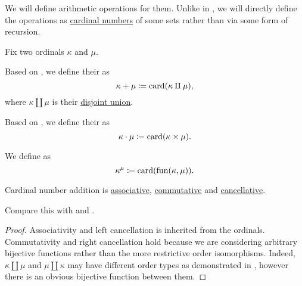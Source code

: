 \begin{definition}\label{def:cardinal_arithmetic}
  We will define arithmetic operations for them. Unlike in , we will directly define the operations as \hyperref[thm:cardinality_existence]{cardinal numbers} of some sets rather than via some form of recursion.

  Fix two ordinals \( \kappa \) and \( \mu \).
  \begin{thmenum}
     Based on , we define their  as
    \begin{equation*}
      \kappa + \mu \coloneqq \operatorname{card}(\kappa \amalg \mu),
    \end{equation*}
    where \( \kappa \amalg \mu \) is their \hyperref[def:disjoint_union]{disjoint union}.

     Based on , we define their  as
    \begin{equation*}
      \kappa \cdot \mu \coloneqq \operatorname{card}(\kappa \times \mu).
    \end{equation*}

     We define  as
    \begin{equation*}
      \kappa^\mu \coloneqq \operatorname{card}(\operatorname{fun}(\kappa, \mu)).
    \end{equation*}
  \end{thmenum}
\end{definition}

\begin{proposition}\label{thm:cardinal_addition_algebraic_properties}
  Cardinal number addition is \hyperref[def:magma/associative]{associative}, \hyperref[def:magma/associative]{commutative} and \hyperref[def:magma/cancellative]{cancellative}.

  Compare this with  and .
\end{proposition}
\begin{proof}
  Associativity and left cancellation is inherited from the ordinals. Commutativity and right cancellation hold because we are considering arbitrary bijective functions rather than the more restrictive order isomorphisms. Indeed, \( \kappa \amalg \mu \) and \( \mu \amalg \kappa \) may have different order types as demonstrated in , however there is an obvious bijective function between them.
\end{proof}

